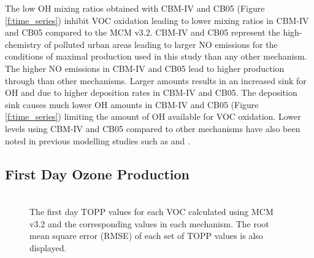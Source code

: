 The low OH mixing ratios obtained with CBM-IV and CB05 (Figure \ref{f:time_series}) inhibit VOC oxidation leading to lower  mixing ratios in CBM-IV and CB05 compared to the MCM v3.2. 
CBM-IV and CB05 represent the high- chemistry of polluted urban areas leading to larger NO emissions for the conditions of maximal  production used in this study than any other mechanism.
The higher NO emissions in CBM-IV and CB05 lead to higher  production through  than other mechanisms.
Larger  amounts results in an increased sink for OH and  due to higher  deposition rates in CBM-IV and CB05.
The  deposition sink causes much lower OH amounts in CBM-IV and CB05 (Figure \ref{f:time_series}) limiting the amount of OH available for VOC oxidation.
Lower  levels using CBM-IV and CB05 compared to other mechanisms have also been noted in previous modelling studies such as \citet{Emmerson:2009} and \citet{Saylor:2012}.

\subsection{First Day Ozone Production} \label{ss:day1} %

\begin{figure}
    \centering
    \includegraphics[width=\textwidth]{img/first_day_values}
    \vspace{1mm}
    \caption{The first day TOPP values for each VOC calculated using MCM v3.2 and the corresponding values in each mechanism. The root mean square error (RMSE) of each set of TOPP values is also displayed.}
    \vspace{-4mm}
    \label{f:first_day}
\end{figure}

